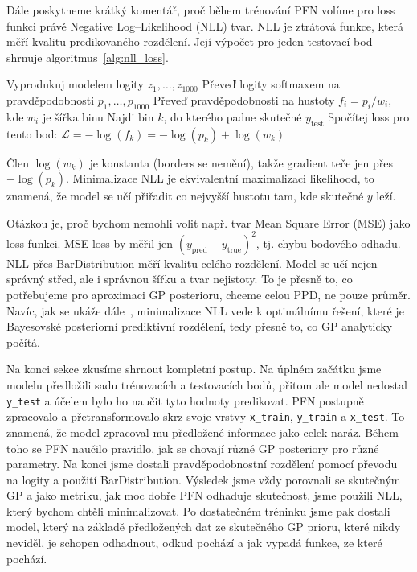 Dále poskytneme krátký komentář, proč během trénování PFN volíme pro loss funkci právě Negative Log–Likelihood (NLL) tvar.
NLL je ztrátová funkce, která měří kvalitu predikovaného rozdělení.
Její výpočet pro jeden testovací bod shrnuje algoritmus~\ref{alg:nll_loss}.

\begin{algorithm}[H]
\caption{Výpočet NLL ztráty přes BarDistribution pro jeden testovací bod}
\label{alg:nll_loss}
\begin{algorithmic}[1]
\State Vyprodukuj modelem logity $z_1, \dots, z_{1000}$
\State Převeď logity softmaxem na pravděpodobnosti $p_1, \dots, p_{1000}$
\State Převeď pravděpodobnosti na hustoty $f_i = p_i / w_i$, kde $w_i$ je šířka binu
\State Najdi bin $k$, do kterého padne skutečné $y_{\text{test}}$
\State Spočítej loss pro tento bod: $\mathcal{L} = -\log(f_k) = -\log(p_k) + \log(w_k)$
\end{algorithmic}
\end{algorithm}

Člen $\log(w_k)$ je konstanta (borders se nemění), takže gradient teče jen přes $-\log(p_k)$. 
Minimalizace NLL je ekvivalentní maximalizaci likelihood, to znamená, že model se učí přiřadit co nejvyšší hustotu tam, kde skutečné $y$ leží.

Otázkou je, proč bychom nemohli volit např. tvar Mean Square Error (MSE) jako loss funkci.
MSE loss by měřil jen $(y_{\text{pred}} - y_{\text{true}})^2$, tj. chybu bodového odhadu. 
NLL přes BarDistribution měří kvalitu celého rozdělení.
Model se učí nejen správný střed, ale i správnou šířku a tvar nejistoty. 
To je přesně to, co potřebujeme pro aproximaci GP posterioru, chceme celou PPD, ne pouze průměr.
Navíc, jak se ukáže dále~\cite{nagler2023}, minimalizace NLL vede k optimálnímu řešení, které je Bayesovské posteriorní prediktivní rozdělení, tedy přesně to, co GP analyticky počítá.
\par    

Na konci sekce zkusíme shrnout kompletní postup.
Na úplném začátku jsme modelu předložili sadu trénovacích a testovacích bodů, přitom ale model nedostal \texttt{y\_test} a účelem bylo ho naučit tyto hodnoty predikovat.
PFN postupně zpracovalo a přetransformovalo skrz svoje vrstvy \texttt{x\_train}, \texttt{y\_train} a \texttt{x\_test}.
To znamená, že model zpracoval mu předložené informace jako celek naráz.
Během toho se PFN naučilo pravidlo, jak se chovají různé GP posteriory pro různé parametry.
Na konci jsme dostali pravděpodobnostní rozdělení pomocí převodu na logity a použití BarDistribution.
Výsledek jsme vždy porovnali se skutečným GP a jako metriku, jak moc dobře PFN odhaduje skutečnost, jsme použili NLL, který bychom chtěli minimalizovat.
Po dostatečném tréninku jsme pak dostali model, který na základě předložených dat ze skutečného GP prioru, které nikdy neviděl, je schopen odhadnout, odkud pochází a jak vypadá funkce, ze které pochází.


